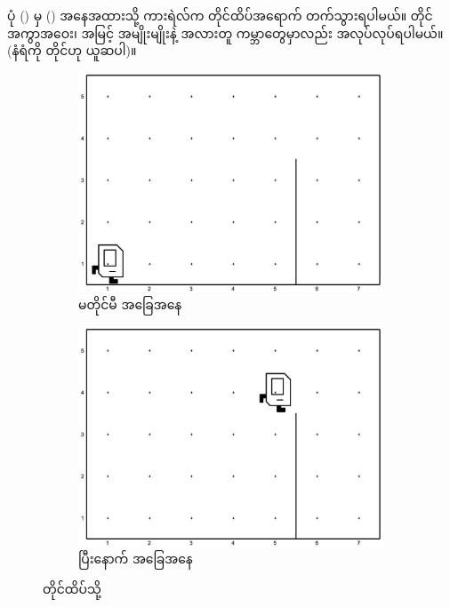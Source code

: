 ပုံ \fRefNo{\ref{fig:to_the_top}} () မှ  () အနေအထားသို့  ကားရဲလ်က တိုင်ထိပ်အရောက် တက်သွားရပါမယ်။  တိုင်အကွာအဝေး၊ အမြင့် အမျိုးမျိုးနဲ့ အလားတူ ကမ္ဘာတွေမှာလည်း အလုပ်လုပ်ရပါမယ်။ (နံရံကို တိုင်ဟု ယူဆပါ)။
%
\begin{figure}[htb!]
    \hfuzz=100pt
    \newcommand{\figpctw}{0.52}
    \newcommand{\figscale}{0.165}
    \begin{subfigure}[t]{{\figpctw}\textwidth}
        \includegraphics[scale=\figscale]{images/ch03/to_the_top/to_the_top_pre.jpg}
        \caption{မတိုင်မီ အခြေအနေ}   
        \label{fig:to_the_top_pre}
    \end{subfigure}
    \begin{subfigure}[t]{{\figpctw}\textwidth}
        \includegraphics[scale=\figscale]{images/ch03/to_the_top/to_the_top_post.jpg}
        \caption{ပြီးနောက် အခြေအနေ} 
        \label{fig:to_the_top_post}   
    \end{subfigure}
    \caption{တိုင်ထိပ်သို့}
    \label{fig:to_the_top}
\end{figure}
